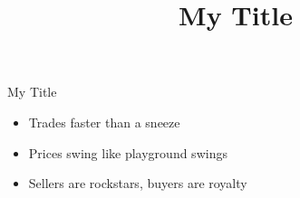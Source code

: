 \documentclass{beamer}
\title{My Title}
\author{}
\date{}
\begin{document}
\begin{frame}
	\titlepage
\end{frame}

\begin{frame}{My Title}
    \begin{itemize}
        \item Trades faster than a sneeze
        \item Prices swing like playground swings
        \item Sellers are rockstars, buyers are royalty
    \end{itemize}
\end{frame}
\end{document}
